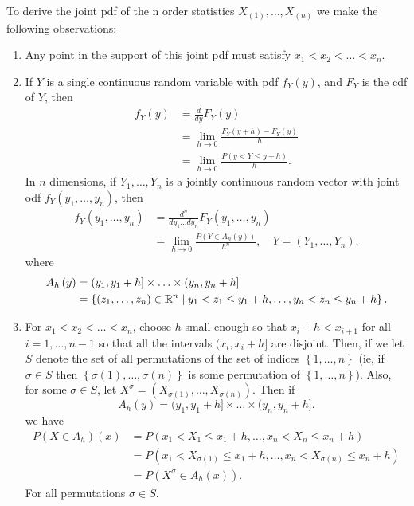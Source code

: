 
To derive the joint pdf of the n order statistics $X_{(1)} , \ldots , X_{(n)}$ we make the following observations:
\begin{enumerate}
	\item Any point in the support of this joint pdf must satisfy $x_1 < x_2 < \ldots < x_n$. 
	\item If $Y$ is a single continuous random variable with pdf $f_{Y}\left( y \right) $, and $F_{Y}$ is the cdf of $Y$, then 
		\begin{align*}
			f_{Y}\left( y \right) &= \frac{d}{dy}F_{Y}\left( y \right)  \\
					      &= \lim_{h \to 0} \frac{F_{Y}\left( y + h \right) - F_{Y}\left( y \right)  }{h} \\
					      &= \lim_{h  \to 0} \frac{P\left( y < Y \le y + h \right) }{h}
		.\end{align*}
In $n$ dimensions, if $Y_{1} , \ldots , Y_{n}$ is a jointly continuous random vector with joint odf $f_{Y}\left( y_{1} , \ldots , y_{n} \right) $, then 
\begin{align*}
	f_{Y}\left( y_{1} , \ldots , y_{n} \right) &= \frac{d ^{n}}{dy_{1}  \ldots  dy_{n}}F_{Y}\left( y_{1} , \ldots , y_{n} \right)  \\
						   &= \lim_{h \to 0} \frac{P\left( Y \in  A_{n}\left( y \right)  \right)}{h^{n}},  \quad  Y =  \left( Y_{1} , \ldots , Y_{n} \right) 
.\end{align*}
where
\begin{align*}
	A_{h}\left( y \right) &= (y_1, y_1 + h] \times  \ldots \times  (y_{n}, y_{n} + h] \\
			      &= \left\{ \left( z_{1} , \ldots , z_{n} \right) \in \mathbb{R}^{n}  \mid y_1 <  z_1 \le  y_1 + h, \ldots , y_{n} < z_{n}\le  y_{n} + h \right\} 
.\end{align*}
\item For $x_1 < x_2 < \ldots < x_n$, choose $h$ small enough so that $x_{i} + h < x_{i + 1} $ for all $i = 1, \ldots, n - 1 $ so that all the intervals $(x_{i}, x_{i} + h]$ are disjoint. Then, if we let $S$ denote the set of all permutations of the set of indices $\left\{ 1, \ldots, n \right\} $ (ie, if $\sigma \in  S$ then $\left\{ \sigma \left( 1 \right) , \ldots , \sigma \left( n \right)  \right\} $ is some permutation of $\left\{ 1, \ldots ,n  \right\} $). Also, for some $\sigma \in  S$, let $X ^{\sigma } = \left( X_{\sigma(1)} , \ldots , X_{\sigma\left( n\right)  } \right)  $. Then if  
	\[
		A_{h}\left( y \right) = (y_1, y_1 + h] \times  \ldots \times  (y_{n}, y_{n} + h]
	.\] 
	we have 
	\begin{align*}
		P\left( X \in  A_{h} \right) \left( x \right) &=  P\left( x_1 <  X_1 \le  x_1 + h, \ldots , x_{n} < X_{n}\le  x_{n} + h \right) \\
							      &=   P\left( x_1 <  X_{\sigma(1)} \le  x_1 + h, \ldots , x_{n} < X_{\sigma(n)}\le  x_{n} + h \right) \\
							      &= P\left( X^{\sigma} \in A_{h}\left( x \right)  \right) 
	.\end{align*}
	For all permutations $\sigma \in  S$. 
\end{enumerate}

